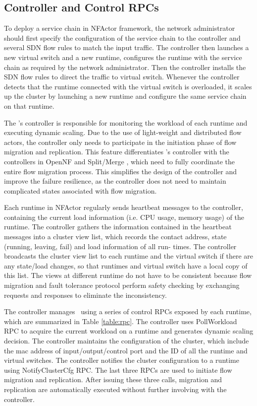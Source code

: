 \subsection{Controller and Control RPCs}
\label{sec:controller}

To deploy a service chain in NFActor framework, the network administrator should first specify the configuration of the service chain to the controller and several SDN flow rules to match the input traffic. The controller then launches a new virtual switch and  a new runtime, configures the runtime with the service chain as required by the network administrator. Then the controller installs the SDN flow rules to direct the traffic to  virtual switch. Whenever the controller detects that the runtime connected with the virtual switch is overloaded, it scales up the cluster by launching a new runtime and configure the same service chain on that runtime.

The \nfactor's controller is responsible for monitoring the workload of each runtime and executing dynamic scaling. Due to the use of light-weight and distributed flow actors, the controller only needs to participate in the initiation phase of flow migration and replication. This feature differentiates \nfactor's controller with the controllers in OpenNF \cite{gember2015opennf} and Split/Merge \cite{rajagopalan2013split}, which need to fully coordinate the entire flow migration process. This simplifies the design of the controller and improve the failure resilience, as the controller does not need to maintain complicated states associated with flow migration.

Each runtime in NFActor regularly sends heartbeat messages to the controller, containing the current load information (i.e. CPU usage, memory usage) of the runtime. The controller gathers the information contained in the heartbeat messages into a cluster view list, which records the contact address, state (running, leaving, fail) and load information of all run- times. The controller broadcasts the cluster view list to each runtime and the virtual switch if there are any state/load changes, so that runtimes and virtual switch have a local copy of this list. The views at different runtime do not have to be consistent because flow migration and fault tolerance protocol perform safety checking by exchanging requests and responses to eliminate the inconsistency.

The controller manages \nfactor~using a series of control RPCs exposed by each runtime, which are summarized in Table \ref{table:rpc}. The controller uses PollWorkload RPC to acquire the current workload on a runtime and generates dynamic scaling decision. The controller maintains the configuration of the cluster, which include the mac address of input/output/control port and the ID of all the runtime and virtual switches. The controller notifies the cluster configuration to a runtime using NotifyClusterCfg RPC. The last three RPCs are used to initiate flow migration and replication. After issuing these three calls, migration and replication are automatically executed without further involving with the controller.

